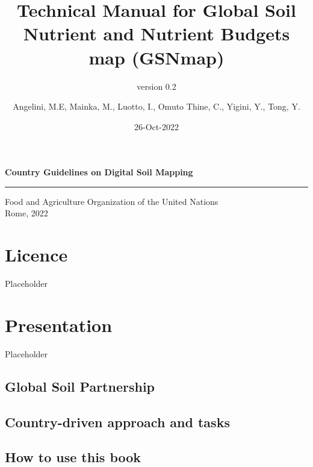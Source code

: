 \documentclass[
  10pt,
  b5paper,
  oneside]{book}
\title{
Technical Manual for Global Soil Nutrient and Nutrient Budgets map (GSNmap)}
\subtitle{version 0.2}
\author{Angelini, M.E, Mainka, M., Luotto, I., Omuto Thine, C., Yigini, Y., Tong, Y.}
\date{26-Oct-2022}
\newcommand\blankpage{%
    \null
    \thispagestyle{empty}%
    \addtocounter{page}{-1}%
    \newpage}
\begin{document}
\maketitle

\pagestyle{plain}

\afterpage{\blankpage}
\thispagestyle{empty}
\begin{titlepage}
    \begin{center}
        \vspace*{4cm}
        \Large

        \textcolor{astral}{\textbf{Country Guidelines on Digital Soil Mapping\\}}
        \vspace{0.5cm}
        \normalsize
        \vfill
        \noindent
        {\color{astral}\rule{\linewidth}{0.5mm} }

        Food and Agriculture Organization of the United Nations\\
	Rome, 2022
    \end{center}
\end{titlepage}



\hypertarget{licence}{%
\chapter*{Licence}\label{licence}}

Placeholder

\hypertarget{presentation}{%
\chapter{Presentation}\label{presentation}}

Placeholder

\hypertarget{global-soil-partnership}{%
\section{Global Soil Partnership}\label{global-soil-partnership}}

\hypertarget{country-driven-approach-and-tasks}{%
\section{Country-driven approach and tasks}\label{country-driven-approach-and-tasks}}

\hypertarget{how-to-use-this-book}{%
\section{How to use this book}\label{how-to-use-this-book}}
\end{document}
